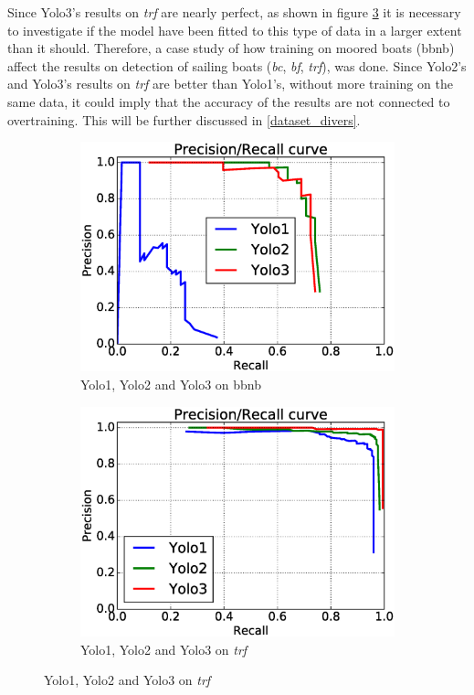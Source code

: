 Since Yolo3's results on \textit{trf} are nearly perfect, as shown in figure \ref{fig:moor_trf} it is necessary to investigate if the model have been fitted to this type of data in a larger extent than it should. Therefore, a case study of how training on moored boats (bbnb) affect the results on detection of sailing boats (\textit{bc}, \textit{bf}, \textit{trf}), was done. Since Yolo2's and Yolo3's results on \textit{trf} are better than Yolo1's, without more training on the same data, it could imply that the accuracy of the results are not connected to overtraining. This will be further discussed in \ref{dataset_divers}.


\begin{figure}[h!]
\begin{subfigure}{.5\textwidth}
  \centering
  \includegraphics[width=0.8\linewidth]{results/case_tr_moor/prec_recall/bb.eps}
  \caption{Yolo1, Yolo2 and Yolo3 on bbnb}
  \label{fig:moor_bb}
\end{subfigure}%
\begin{subfigure}{.5\textwidth}
  \centering
  \includegraphics[width=.8\linewidth]{results/case_tr_moor/prec_recall/trf.eps}
  \caption{Yolo1, Yolo2 and Yolo3 on \textit{trf}}
  \label{fig:moor_trf}
\end{subfigure}


\end{figure}
